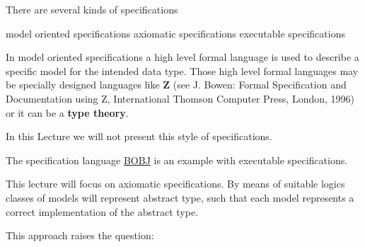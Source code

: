 \documentclass[landscape, autoslides, light]{mmiss}
\newcommand{\ns}{\normalsize}
\begin{document}
\begin{Package}[Label={FSDPT}, Title={Formal Specification of Data and Process Types}, ShortTitle={FSDPT}, Authors={Horst Reichel}, Date={February 2003}, LevelOfDetail=Lecture, Language=en-GB]
\begin{Section}[Title={Literature}, Label={section1}]
\begin{Paragraph}[Title={Process Types}, Label=Paragraph2]
\end{Paragraph}
\end{Section}
\begin{Section}[Title={Introduction}, Label={section2}]


\begin{Paragraph}[Title={Kinds of  Specifications}, Label=Paragraph3]
\pause

There are several kinds of specifications \pause

\begin{List}[ListType=itemize]
 \ListItem model oriented specifications \pause
 \ListItem axiomatic specifications \pause
 \ListItem executable specifications
\end{List}


\end{Paragraph}
\begin{Paragraph}[Title={Model oriented Specifications}, Label=Paragraph4]

\small
In model oriented specifications a high level formal language is
used to describe a specific model for the intended data type.
Those high level formal languages may be specially designed
languages like \textbf{Z} (see J. Bowen: Formal Specification and
Documentation using Z, International Thomson Computer Press,
London, 1996) or it can be a \textbf{type theory}.

In this Lecture we will not present this style of specifications.

The specification language \hyperlink{BOBJ}{BOBJ} is an example
with executable specifications.
\ns


\end{Paragraph}
\begin{Paragraph}[Title={Axiomatic Specifications}, Label=Paragraph5]

This lecture will focus on axiomatic specifications. By means of
suitable logics classes of models will represent abstract type,
such that each model represents a correct implementation of the
abstract type.\pause

This approach raises the question: 



\end{Paragraph}
\end{Section}
\end{Package}
\end{document}
